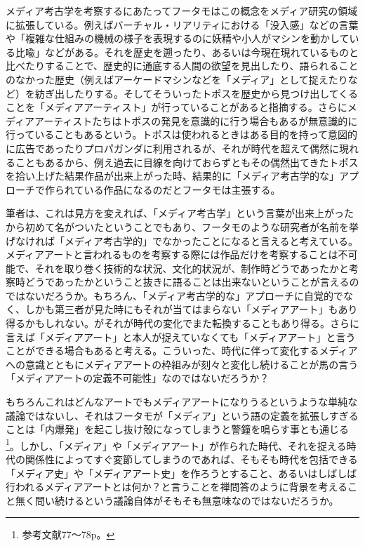 \documentclass[a4paper,report]{jsbook}
\begin{document}
メディア考古学を考察するにあたってフータモはこの概念をメディア研究の領域に拡張している。例えばバーチャル・リアリティにおける「没入感」などの言葉や「複雑な仕組みの機械の様子を表現するのに妖精や小人がマシンを動かしている比喩」などがある。それを歴史を遡ったり、あるいは今現在現れているものと比べたりすることで、歴史的に通底する人間の欲望を見出したり、語られることのなかった歴史（例えばアーケードマシンなどを「メディア」として捉えたりなど）を紡ぎ出したりする。そしてそういったトポスを歴史から見つけ出してくることを「メディアアーティスト」が行っていることがあると指摘する。さらにメディアアーティストたちはトポスの発見を意識的に行う場合もあるが無意識的に行っていることもあるという。トポスは使われるときはある目的を持って意図的に広告であったりプロパガンダに利用されるが、それが時代を超えて偶然に現れることもあるから、例え過去に目線を向けておらずともその偶然出てきたトポスを拾い上げた結果作品が出来上がった時、結果的に「メディア考古学的な」アプローチで作られている作品になるのだとフータモは主張する。

筆者は、これは見方を変えれば、「メディア考古学」という言葉が出来上がったから初めて名がついたということでもあり、フータモのような研究者が名前を挙げなければ「メディア考古学的」でなかったことになると言えると考えている。メディアアートと言われるものを考察する際には作品だけを考察することは不可能で、それを取り巻く技術的な状況、文化的状況が、制作時どうであったかと考察時どうであったかということ抜きに語ることは出来ないということが言えるのではないだろうか。もちろん、「メディア考古学的な」アプローチに自覚的でなく、しかも第三者が見た時にもそれが当てはまらない「メディアアート」もあり得るかもしれない。がそれが時代の変化でまた転換することもあり得る。さらに言えば「メディアアート」と本人が捉えていなくても「メディアアート」と言うことができる場合もあると考える。こういった、時代に伴って変化するメディアへの意識とともにメディアアートの枠組みが刻々と変化し続けることが馬の言う「メディアアートの定義不可能性」なのではないだろうか？

もちろんこれはどんなアートでもメディアアートになりうるというような単純な議論ではないし、それはフータモが「メディア」という語の定義を拡張しすぎることは「内爆発」を起こし抜け殻になってしまうと警鐘を鳴らす事とも通じる\footnote{参考文献\autocite{huhtamo:mediaarcheology}77〜78p。}。しかし、「メディア」や「メディアアート」が作られた時代、それを捉える時代の関係性によってすぐ変節してしまうのであれば、そもそも時代を包括できる「メディア史」や「メディアアート史」を作ろうとすること、あるいはしばしば行われるメディアアートとは何か？と言うことを禅問答のように背景を考えること無く問い続けるという議論自体がそもそも無意味なのではないだろうか。
\end{document}
